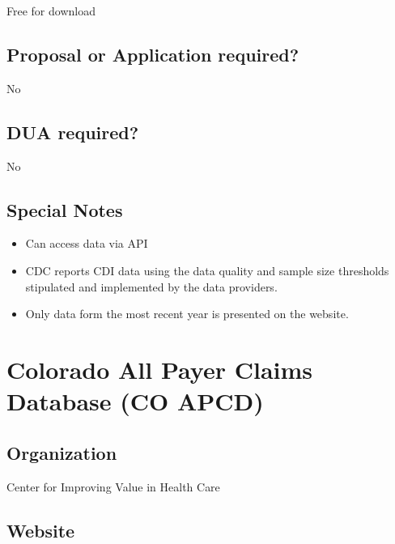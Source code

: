 \documentclass[
]{book}
\providecommand{\tightlist}{%
  \setlength{\itemsep}{0pt}\setlength{\parskip}{0pt}}
\begin{document}
Free for download

\hypertarget{proposal-or-application-required-15}{%
\section{Proposal or Application required?}\label{proposal-or-application-required-15}}

No

\hypertarget{dua-required-15}{%
\section{DUA required?}\label{dua-required-15}}

No

\hypertarget{special-notes-15}{%
\section{Special Notes}\label{special-notes-15}}

\begin{itemize}
\tightlist
\item
  Can access data via API
\item
  CDC reports CDI data using the data quality and sample size thresholds stipulated and implemented by the data providers.
\item
  Only data form the most recent year is presented on the website.
\end{itemize}

\mainmatter

\hypertarget{colorado-all-payer-claims-database-co-apcd}{%
\chapter{Colorado All Payer Claims Database (CO APCD)}\label{colorado-all-payer-claims-database-co-apcd}}

\hypertarget{organization-16}{%
\section{Organization}\label{organization-16}}

Center for Improving Value in Health Care

\hypertarget{website-16}{%
\section{Website}\label{website-16}}
\end{document}
